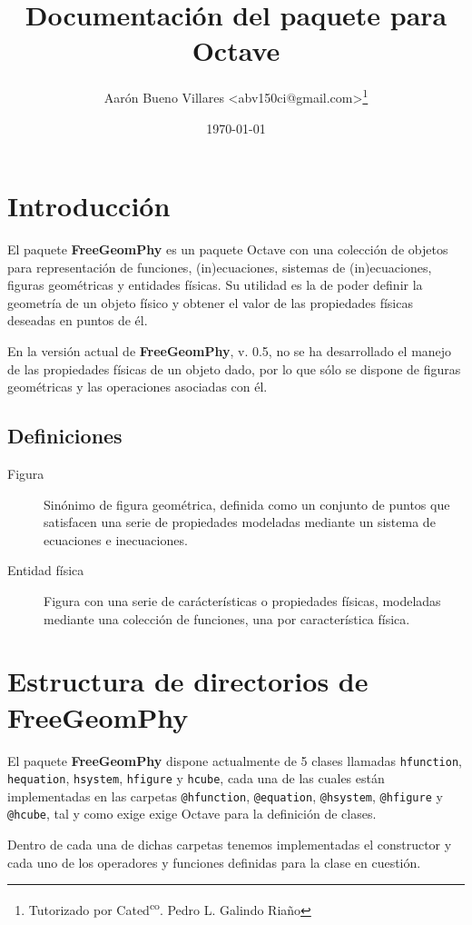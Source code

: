 \documentclass{article}
\title{Documentación del paquete \cfgp para Octave}
\author{Aarón Bueno Villares \textless abv150ci@gmail.com\textgreater \thanks{Tutorizado por
    Cated\textsuperscript{co}. Pedro L. Galindo Riaño}}
\date{\today}
\newcommand{\fgp}{\textbf{FreeGeomPhy}\xspace}
\newcommand{\fgpv}{v. 0.5\xspace}
\begin{document}
\maketitle
\setcounter{tocdepth}{2}
\tableofcontents

\section{Introducción}
\label{sec:intro}
El paquete \fgp es un paquete Octave con una colección de objetos para
representación de funciones, (in)ecuaciones, sistemas de (in)ecuaciones,
figuras geométricas y entidades físicas. Su utilidad es la de
poder definir la geometría de un objeto físico y obtener el valor de
las propiedades físicas deseadas en puntos de él.

En la versión actual de \fgp, \fgpv, no se ha desarrollado el manejo
de las propiedades físicas de un objeto dado, por lo que sólo se
dispone de figuras geométricas y las operaciones asociadas con él.

\subsection{Definiciones}
\begin{description}
  \item[Figura] Sinónimo de figura geométrica, definida como un
    conjunto de puntos que satisfacen una serie de propiedades
    modeladas mediante un sistema de ecuaciones e inecuaciones.
  \item[Entidad física] Figura con una serie de carácterísticas o
    propiedades físicas, modeladas mediante una colección de
    funciones, una por característica física.
\end{description}

\section{Estructura de directorios de \fgp}
\label{sec:struct}
El paquete \fgp dispone actualmente de 5 clases llamadas
\texttt{hfunction}, \texttt{hequation}, \texttt{hsystem},
\texttt{hfigure} y \texttt{hcube}, cada una de las cuales están
implementadas en las carpetas \texttt{@hfunction},
\texttt{@equation}, \texttt{@hsystem}, \texttt{@hfigure} y
\texttt{@hcube}, tal y como exige exige Octave para la definición de
clases.

Dentro de cada una de dichas carpetas tenemos implementadas el
constructor y cada uno de los operadores y funciones definidas para la
clase en cuestión.
\end{document}
